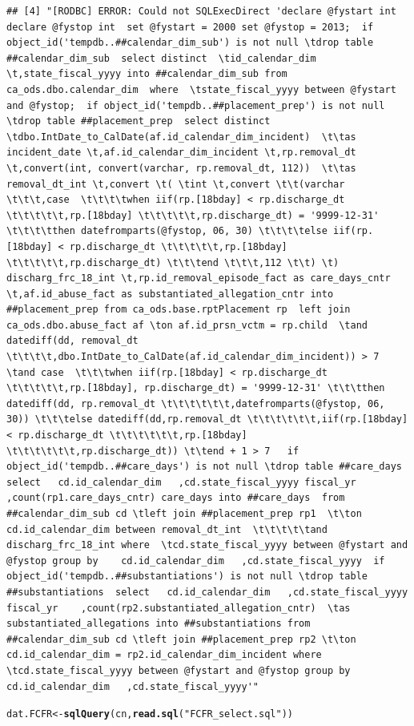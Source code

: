 \documentclass[12pt]{article}\usepackage[]{graphicx}\usepackage[]{color}
\makeatletter
\newcommand{\hlstr}[1]{\textcolor[rgb]{0.192,0.494,0.8}{#1}}%
\newcommand{\hlstd}[1]{\textcolor[rgb]{0.345,0.345,0.345}{#1}}%
\newcommand{\hlkwb}[1]{\textcolor[rgb]{0.69,0.353,0.396}{#1}}%
\newcommand{\hlkwd}[1]{\textcolor[rgb]{0.737,0.353,0.396}{\textbf{#1}}}%
\newenvironment{kframe}{%
 \def\at@end@of@kframe{}%
 \ifinner\ifhmode%
  \def\at@end@of@kframe{\end{minipage}}%
  \begin{minipage}{\columnwidth}%
 \fi\fi%
 \def\FrameCommand##1{\hskip\@totalleftmargin \hskip-\fboxsep
 \colorbox{shadecolor}{##1}\hskip-\fboxsep
     \hskip-\linewidth \hskip-\@totalleftmargin \hskip\columnwidth}%
 \MakeFramed {\advance\hsize-\width
   \@totalleftmargin\z@ \linewidth\hsize
   \@setminipage}}%
 {\par\unskip\endMakeFramed%
 \at@end@of@kframe}
\newenvironment{knitrout}{}{} %
\makeatother
\begin{document}
\begin{knitrout}
\begin{kframe}
\begin{verbatim}
## [4] "[RODBC] ERROR: Could not SQLExecDirect 'declare @fystart int declare @fystop int  set @fystart = 2000 set @fystop = 2013;  if object_id('tempdb..##calendar_dim_sub') is not null \tdrop table ##calendar_dim_sub  select distinct  \tid_calendar_dim \t,state_fiscal_yyyy into ##calendar_dim_sub from ca_ods.dbo.calendar_dim  where  \tstate_fiscal_yyyy between @fystart and @fystop;  if object_id('tempdb..##placement_prep') is not null \tdrop table ##placement_prep  select distinct  \tdbo.IntDate_to_CalDate(af.id_calendar_dim_incident)  \t\tas incident_date \t,af.id_calendar_dim_incident \t,rp.removal_dt \t,convert(int, convert(varchar, rp.removal_dt, 112))  \t\tas removal_dt_int \t,convert \t( \tint \t,convert \t\t(varchar \t\t\t,case  \t\t\t\twhen iif(rp.[18bday] < rp.discharge_dt \t\t\t\t\t,rp.[18bday] \t\t\t\t\t,rp.discharge_dt) = '9999-12-31' \t\t\t\tthen datefromparts(@fystop, 06, 30) \t\t\t\telse iif(rp.[18bday] < rp.discharge_dt \t\t\t\t\t,rp.[18bday] \t\t\t\t\t,rp.discharge_dt) \t\t\tend \t\t\t,112 \t\t) \t) discharg_frc_18_int \t,rp.id_removal_episode_fact as care_days_cntr \t,af.id_abuse_fact as substantiated_allegation_cntr into ##placement_prep from ca_ods.base.rptPlacement rp  left join ca_ods.dbo.abuse_fact af \ton af.id_prsn_vctm = rp.child  \tand datediff(dd, removal_dt \t\t\t\t,dbo.IntDate_to_CalDate(af.id_calendar_dim_incident)) > 7 \tand case  \t\t\twhen iif(rp.[18bday] < rp.discharge_dt \t\t\t\t\t,rp.[18bday], rp.discharge_dt) = '9999-12-31' \t\t\tthen datediff(dd, rp.removal_dt \t\t\t\t\t\t,datefromparts(@fystop, 06, 30)) \t\t\telse datediff(dd,rp.removal_dt \t\t\t\t\t\t,iif(rp.[18bday] < rp.discharge_dt \t\t\t\t\t\t,rp.[18bday] \t\t\t\t\t\t,rp.discharge_dt)) \t\tend + 1 > 7   if object_id('tempdb..##care_days') is not null \tdrop table ##care_days  select   cd.id_calendar_dim   ,cd.state_fiscal_yyyy fiscal_yr    ,count(rp1.care_days_cntr) care_days into ##care_days  from ##calendar_dim_sub cd \tleft join ##placement_prep rp1  \t\ton cd.id_calendar_dim between removal_dt_int  \t\t\t\t\tand discharg_frc_18_int where  \tcd.state_fiscal_yyyy between @fystart and @fystop group by    cd.id_calendar_dim   ,cd.state_fiscal_yyyy  if object_id('tempdb..##substantiations') is not null \tdrop table ##substantiations  select   cd.id_calendar_dim   ,cd.state_fiscal_yyyy fiscal_yr    ,count(rp2.substantiated_allegation_cntr)  \tas substantiated_allegations into ##substantiations from ##calendar_dim_sub cd \tleft join ##placement_prep rp2 \t\ton cd.id_calendar_dim = rp2.id_calendar_dim_incident where  \tcd.state_fiscal_yyyy between @fystart and @fystop group by    cd.id_calendar_dim   ,cd.state_fiscal_yyyy'"
\end{verbatim}
\begin{alltt}
\hlstd{dat.FCFR} \hlkwb{<-} \hlkwd{sqlQuery}\hlstd{(cn,} \hlkwd{read.sql}\hlstd{(}\hlstr{"FCFR_select.sql"}\hlstd{))}


\end{alltt}
\end{kframe}
\end{knitrout}
\end{document}
